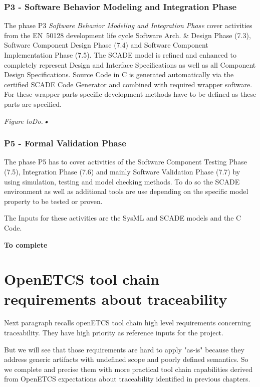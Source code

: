 \documentclass[11pt]{template/openetcs_report}
\begin{document}
\subsection{P3 - Software Behavior Modeling and Integration Phase}

The phase P3 \textit{Software Behavior Modeling and Integration Phase} cover activities from the EN~50128 development life cycle Software Arch. \& Design Phase (7.3), Software Component Design Phase (7.4) and Software Component Implementation Phase (7.5). 
The SCADE model is refined and enhanced to completely represent Design and Interface Specifications as well as all Component Design Specifications. Source Code in C is generated automatically via the certified SCADE Code Generator and combined with required wrapper software. For these wrapper parts specific development methods have to be defined as these parts are specified.

\textit{Figure toDo.\textbf{•}}


\subsection{P5 - Formal Validation Phase}

The phase P5 has to cover activities of the Software Component Testing Phase (7.5), Integration Phase (7.6) and mainly Software Validation Phase (7.7) by using simulation, testing and model checking methods. To do so the SCADE environment as well as additional tools are use depending on the specific model property to be tested or proven. 

The Inputs for these activities are the SysML and SCADE models and the C Code.

\textbf{To complete}

\chapter{OpenETCS tool chain requirements about traceability}
\label{sec-4} 

Next paragraph recalls openETCS tool chain  high level requirements concerning traceability. They have high priority as reference inputs for the project.

But we will see that those requirements are hard to apply "as-is" because they address generic artifacts with undefined scope and poorly defined semantics. So we complete and precise them with more practical tool chain capabilities derived from OpenETCS expectations about traceability identified in previous chapters. 
\end{document}
